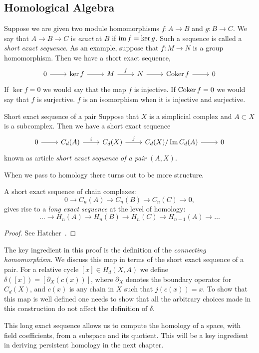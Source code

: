 \subsection{Homological Algebra} 
Suppose we are given two module homomorphisms $f: A \rightarrow B$ and $g: B \rightarrow C$. We say that $A \rightarrow B \rightarrow C$
is \emph{exact} at $B$ if $\operatorname{im}{f} =  \ker{g}$. Such a sequence is called a \emph{short exact sequence}. As an example, suppose that $f: M \rightarrow N$ is a group homomorphism. Then we have a short exact sequence,
\[ 
\begin{tikzcd}
0 \arrow{r} & \ker{f} \arrow{r} & M \arrow{r}{f} & N \arrow{r} & \coker{f} \arrow{r}& 0
\end{tikzcd}
\] 
If $\ker{f} = 0$ we would say that the map $f$ is injective. If $\operatorname{Coker}{f} = 0$ we would say that $f$ is surjective. $f$ is an isomorphism when it is injective and surjective. 
\begin{definition}{Short exact sequence of a pair}
Suppose that $X$ is a simplicial complex and $A \subset X$ is a subcomplex. Then we have a short exact sequence 
\[
\begin{tikzcd}
0 \arrow{r}& C_d(A) \arrow{r}{i} & C_d(X) \arrow{r}{j} & C_d(X)/\Im{C_d(A)} \arrow{r} & 0 
\end{tikzcd}
\]
known as article \emph{short exact sequence of a pair} $(A,X)$.
\end{definition}
When we pass to homology there turns out to be more structure.
\begin{theorem} 
A short exact sequence of chain complexes: 
\[  0 \rightarrow C_n(A) \rightarrow C_n(B) \rightarrow C_n(C) \rightarrow 0, \]
gives rise to a \emph{long exact sequence} at the level of homology:
\[ \ldots \rightarrow H_n(A) \rightarrow H_n(B) \rightarrow H_n(C) \rightarrow H_{n-1}(A) \rightarrow \ldots  \]  
\end{theorem}
\begin{proof}
See Hatcher~\cite{hatcher}.
\end{proof}
The key ingredient in this proof is the definition of the \emph{connecting homomorphism}. We discuss this map in terms of the short exact sequence of a pair. For a relative cycle $[x] \in H_d(X,A)$ we define $\delta([x]) = [\partial_X(c(x))]$, where $\partial_X$ denotes the boundary operator for $C_d(X)$, and $c(x)$ is any chain in $X$ such that $j(c(x)) = x$. To show that this map is well defined one needs to show that all the arbitrary choices made in this construction do not affect the definition of $\delta$. 
 
This long exact sequence allows us to compute the homology of a space, with field coefficients, from a subspace and its quotient. This will be a key ingredient in deriving persistent homology in the next chapter.